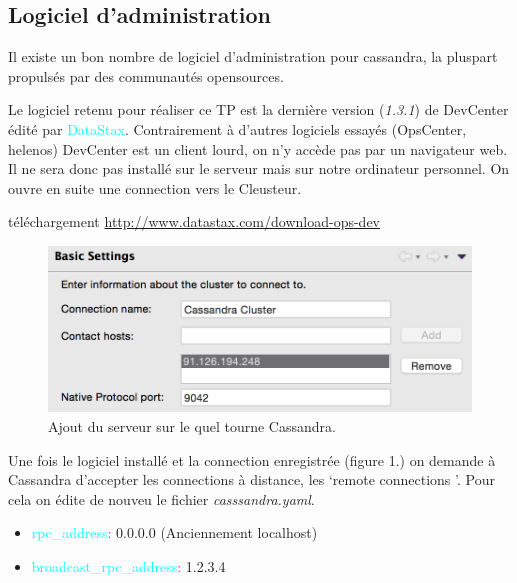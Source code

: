 \subsection{Logiciel d'administration}
\par Il existe un bon nombre de logiciel d'administration pour cassandra, la pluspart propulsés par des communautés opensources.
\par Le logiciel retenu pour réaliser ce TP est la dernière version (\textit{1.3.1}) de DevCenter édité par \textcolor{cyan}{DataStax}.
Contrairement à d'autres logiciels essayés (OpsCenter, helenos) DevCenter est un client lourd, on n'y accède pas par
un navigateur web. Il ne sera donc pas installé sur le serveur mais sur notre ordinateur personnel. On ouvre en suite
une connection vers le Cleusteur.
\begin{block}{téléchargement}
\href{http://www.datastax.com/download-ops-dev}{http://www.datastax.com/download-ops-dev}
\end{block}

\begin{figure}[h!]
\centering
\includegraphics[scale=0.5]{img/ip.png}
\caption{Ajout du serveur sur le quel tourne Cassandra.}
\end{figure}

\par Une fois le logiciel installé et la connection enregistrée (figure 1.) on demande à Cassandra d'accepter les connections à 
distance, les \lq remote connections \rq. Pour cela on édite de nouveu le fichier \textit{casssandra.yaml}.
\begin{itemize}
\item \textcolor{cyan}{rpc\_address}\textcolor{magenta}{:} 0.0.0.0 (Anciennement localhost)
\item \textcolor{cyan}{broadcast\_rpc\_address}\textcolor{magenta}{:} 1.2.3.4
\end{itemize}


